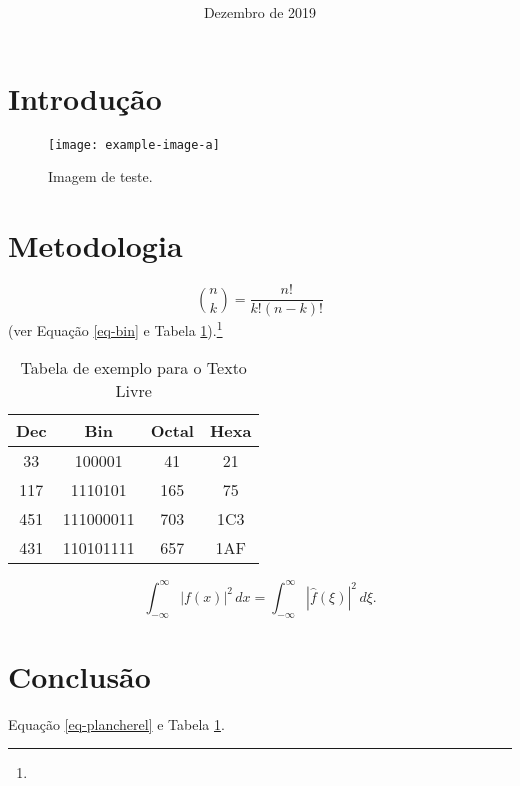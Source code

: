\documentclass[red]{textolivre}
\title{%
    \vspace{-15mm}%
    \selectfont\textbf{\MakeUppercase{\tituloportugues}} \\
    \vspace{2.1mm}
    \selectfont\textbf{\textit{{\MakeUppercase{\tituloingles}}}}%
}
\date{Dezembro de 2019}
\begin{document}
\maketitle

\section{Introdução}
\lipsum[1-10]
\lipsum[11][1-2]\cite{donaldknuth1984,leslielamport1994}\lipsum[11][3-5]

\begin{figure}[htbp]
 \centering
 \texttt{[image: example-image-a]}
 \caption{Imagem de teste.}
 \label{fig-img-a}
\end{figure}

\lipsum[12]

\section{Metodologia}
\lipsum[13-14]
\begin{equation}\label{eq-bin}
\binom{n}{k} = \frac{n!}{k!(n-k)!}
\end{equation}
\lipsum[15] (ver Equação \ref{eq-bin} e Tabela \ref{tab-exemplo}).\footnote{\lipsum[30]}

\begin{table}[htbp]
\centering
\caption{Tabela de exemplo para o Texto Livre}\label{tab-exemplo}
\begin{tabular}{cccc}
\toprule
  Dec  & Bin       & Octal & Hexa \\
\midrule  
  33   & 100001    &  41   & 21   \\
\midrule
  117  & 1110101   & 165   & 75   \\
\midrule
  451  & 111000011 & 703   & 1C3  \\
\midrule
  431  & 110101111 & 657   & 1AF  \\
\bottomrule
\end{tabular}
\end{table}

\lipsum[16]

\begin{equation}\label{eq-plancherel}
\int_{-\infty}^\infty \left| f(x) \right|^2\,dx = \int_{-\infty}^\infty \left| \hat{f}(\xi) \right|^2\,d\xi.
\end{equation}

\lipsum[20-21]

\section{Conclusão}
\lipsum[17-19]
Equação \ref{eq-plancherel} e Tabela \ref{tab-exemplo}.
\lipsum[18]


\printbibliography[title=Refer\^{e}ncias]
\end{document}
